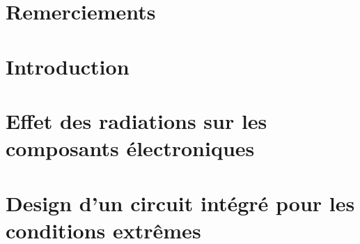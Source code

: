 \documentclass[french,12pt,a4paper]{report}
\begin{document}


%



\chapter*{Remerciements}



\tableofcontents
\newpage

\chapter*{Introduction}
 

\chapter{Effet des radiations sur les composants électroniques}
% 


% 
\chapter{Design d'un circuit intégré pour les conditions extrêmes}


\end{document}
